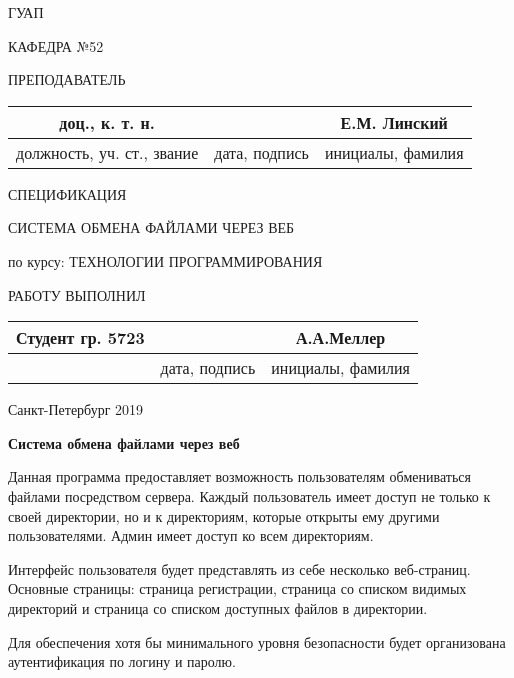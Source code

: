 \documentclass[12pt,a4paper]{article}
\begin{document}
\thispagestyle{empty}
\begin{center}
ГУАП

КАФЕДРА №52
\end{center}

\vspace{30mm} 
ПРЕПОДАВАТЕЛЬ

\begin{tabular}{ |c|c|c| }
\hline
доц., к. т. н. &  & Е.М. Линский \\\hline
должность, уч. ст., звание & дата, подпись & инициалы, фамилия \\\hline
\end{tabular}

\vspace{30mm}
\begin{center}
СПЕЦИФИКАЦИЯ

СИСТЕМА ОБМЕНА ФАЙЛАМИ ЧЕРЕЗ ВЕБ
\end{center}

\vspace{10mm}
по курсу: ТЕХНОЛОГИИ ПРОГРАММИРОВАНИЯ

\vspace{50mm}
\hspace{8mm}РАБОТУ ВЫПОЛНИЛ
\begin{center}
\begin{tabular}{ |c|c|c| }
\hline
Студент гр. 5723 &  & А.А.Меллер \\\hline
 & дата, подпись & инициалы, фамилия \\
\hline
\end{tabular}
\vspace{15mm}

Санкт-Петербург 2019
\end{center}

\newpage
\begin{center}
   \Large{\bf Система обмена файлами через веб } 
\end{center}

Данная программа предоставляет возможность пользователям обмениваться файлами посредством сервера. Каждый пользователь имеет доступ не только к своей директории, но и к директориям, которые открыты ему другими пользователями. Админ имеет доступ ко всем директориям. 

Интерфейс пользователя будет представлять из себе несколько веб-страниц. Основные страницы: страница регистрации, страница со списком видимых директорий и страница со списком доступных файлов в директории.

Для обеспечения хотя бы минимального уровня безопасности будет организована аутентификация по логину и паролю.
\end{document}
